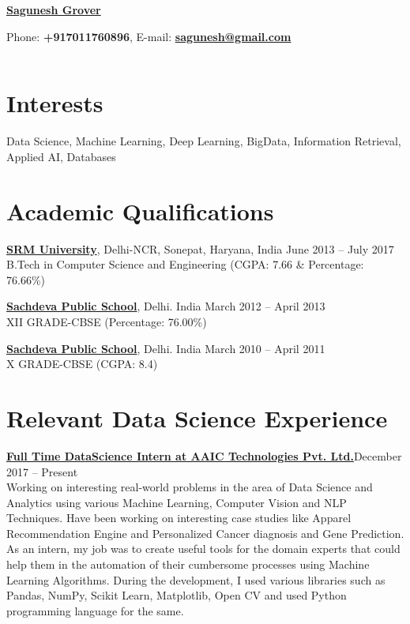 \documentclass[margin,line]{res}
\begin{document}
\centerline{\LARGE  { \bf \href{https://saguneshgrover.com}{Sagunesh Grover} }} \hfill 
\centerline{{ Phone:}{ \bf +917011760896}, {E-mail:}{{ \href{mailto: sagunesh@gmail.com}{\bf sagunesh@gmail.com}}}\\}

\begin{resume}

\vspace{.005in}
\begin{tabular}{@{}p{3.5in}p{3in}}



\end{tabular}


\section{\sc Interests}

 Data Science, Machine Learning, Deep Learning, BigData, Information Retrieval, Applied AI, Databases

\section{\sc Academic Qualifications}
{\bf \href{http://www.srmuniversity.ac.in}{ SRM University}}, Delhi-NCR, Sonepat, Haryana, India \hfill June 2013 -- July 2017\\
B.Tech in Computer Science and Engineering \hfill(CGPA: 7.66 \& Percentage: 76.66\%)

{\bf \href{https://www.spsrohini.com}{ Sachdeva Public School}}, Delhi. India \hfill March 2012 -- April 2013\\
 XII GRADE-CBSE \hfill(Percentage: 76.00\%)

{\bf \href{https://www.spsrohini.com/}{ Sachdeva Public School}}, Delhi. India \hfill March 2010 -- April 2011\\
 X  GRADE-CBSE \hfill(CGPA: 8.4)\\


\section{\sc Relevant Data Science Experience}

{\bf \href{https://github.com/sagunesh/ML-CaseStudies} { Full Time DataScience Intern at AAIC Technologies Pvt. Ltd.}}\hfill {December 2017 --   Present}\\
Working on interesting real-world problems in the area of Data Science and Analytics using various Machine Learning, Computer Vision and NLP Techniques. Have been working on interesting case studies like Apparel Recommendation Engine and Personalized Cancer diagnosis and Gene Prediction. As an intern, my job was to create useful tools for the domain experts that could help them in the automation of their cumbersome processes using Machine Learning Algorithms. During the development, I used various libraries such as Pandas, NumPy, Scikit Learn, Matplotlib, Open CV and used Python programming language for the same.\\


\end{resume}
\end{document}
